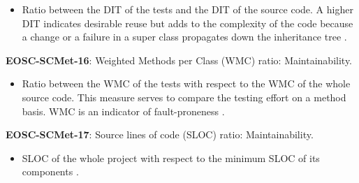\begin{itemize}
    \item Ratio between the DIT of the tests and the DIT of the source code. A higher DIT indicates desirable reuse but adds to the complexity of the code because a change or a failure in a super class propagates down the inheritance tree \cite{nagappan_early_2005}.
\end{itemize}

\textbf{EOSC-SCMet-16}: Weighted Methods per Class (WMC) ratio: Maintainability.

\begin{itemize}
    \item Ratio between the WMC of the tests with respect to the WMC of the whole source code. This measure serves to compare the testing effort on a method basis. WMC is an indicator of fault-proneness \cite{nagappan_early_2005}.
\end{itemize}

\textbf{EOSC-SCMet-17}: Source lines of code (SLOC) ratio: Maintainability.

\begin{itemize}
    \item SLOC of the whole project with respect to the minimum SLOC of its components \cite{nagappan_early_2005}.
\end{itemize}







